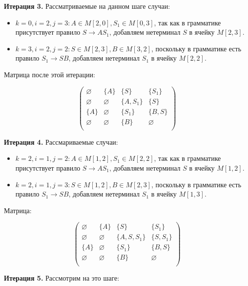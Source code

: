 \begin{example}
\textbf{Итерация 3.}
Рассматриваемые на данном шаге случаи:

\begin{itemize}
	\setlength\itemsep{1em}
	\item $k = 0, i = 2, j = 3: A \in M[2, 0], S_1 \in M[0, 3]$, так как в грамматике присутствует правило $S \to A S_1$, добавляем нетерминал $S$ в ячейку $M[2, 3]$.
	\item $k = 3, i = 2, j = 2: S \in M[2, 3], B \in M[3, 2]$, поскольку в грамматике есть правило $S_1 \to S B$, добавляем нетерминал $S_1$ в ячейку $M[2, 2]$.
\end{itemize}

Матрица после этой итерации:

\[
\begin{pmatrix}
\varnothing & \{A\}  	  & \{S\} 	   & \{S_1\} 	 \\
\varnothing & \varnothing & \{A, S_1\} & \{S\}  	 \\
\{A\} 		& \varnothing & \{S_1\}	   & \{B, S\} 	 \\
\varnothing & \varnothing & \{B\}	   & \varnothing \\
\end{pmatrix}
\]

\textbf{Итерация 4.}
Рассмариваемые случаи:

\begin{itemize}
	\setlength\itemsep{1em}
	\item $k = 2, i = 1, j = 2: A \in M[1, 2], S_1 \in M[2, 2]$, так как в грамматике присутствует правило $S \to A S_1$, добавляем нетерминал $S$ в ячейку $M[1, 2]$.
	\item $k = 2, i = 1, j = 3: S \in M[1, 2], B \in M[2, 3]$, поскольку в грамматике есть правило $S_1 \to S B$, добавляем нетерминал $S_1$ в ячейку $M[1, 3]$.
\end{itemize}

Матрица:

\[
\begin{pmatrix}
\varnothing & \{A\}  	  & \{S\} 	      & \{S_1\}     \\
\varnothing & \varnothing & \{A, S, S_1\} & \{S, S_1\}  \\
\{A\} 		& \varnothing & \{S_1\}	  	  & \{B, S\}    \\
\varnothing & \varnothing & \{B\}	      & \varnothing \\
\end{pmatrix}
\]

\textbf{Итерация 5.}
Рассмотрим на это шаге:


\end{example}
